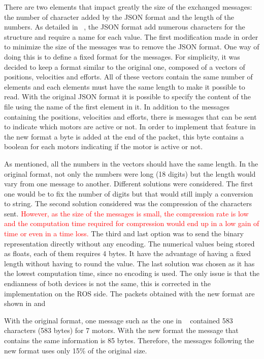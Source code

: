 There are two elements that impact greatly the size of the exchanged messages: the number of character added by the JSON format and the length of the numbers.
As detailed in ~, the JSON format add numerous characters for the structure and require a name for each value. The first modification made in order to minimize the size of the messages was to remove the JSON format. One way of doing this is to define a fixed format for the messages. For simplicity, it was decided to keep a format similar to the original one, composed of a vectors of positions, velocities and efforts. All of these vectors contain the same number of elements and each elements must have the same length to make it possible to read. 
With the original \gls{JSON} format it is possible to specify the content of the file using the name of the first element in it. In addition to the messages containing the positions, velocities and efforts, there is messages that can be sent to indicate which motors are active or not. In order to implement that feature in the new format a byte is added at the end of the packet, this byte contains a boolean for each motors indicating if the motor is active or not.

As mentioned, all the numbers in the vectors should have the same length. In the original format, not only the numbers were long (18 digits) but the length would vary from one message to another. Different solutions were considered. The first one would be to fix the number of digits but that would still imply a conversion to string. The second solution considered was the compression of the characters sent.  \textcolor{red}{However, as the size of the messages is small, the compression rate is low and the computation time required for compression would end up in a low gain of time or even in a time loss.} The third and last option was to send the binary representation directly without any encoding. The numerical values being stored as floats, each of them requires 4 bytes. It have the advantage of having a fixed length without having to round the value. The last solution was chosen as it has the lowest computation time, since no encoding is used. The only issue is that the endianness of both devices is not the same, this is corrected in the implementation on the ROS side. The packets obtained with the new format are shown in  and 

With the original format, one message such as the one in ~ contained 583 characters (583 bytes) for 7 motors. With the new format the message that contains the same information is 85 bytes. Therefore, the messages following the new format uses only 15\% of the original size.

